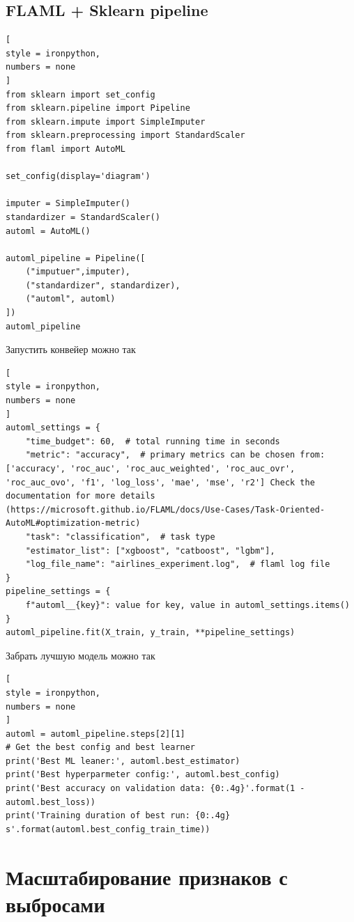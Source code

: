 \documentclass[%
	11pt,
	a4paper,
	utf8,
		]{article}
\begin{document}
\subsection{FLAML + Sklearn pipeline}

\begin{lstlisting}[
style = ironpython,
numbers = none
]
from sklearn import set_config
from sklearn.pipeline import Pipeline
from sklearn.impute import SimpleImputer
from sklearn.preprocessing import StandardScaler
from flaml import AutoML

set_config(display='diagram')

imputer = SimpleImputer()
standardizer = StandardScaler()
automl = AutoML()

automl_pipeline = Pipeline([
	("imputuer",imputer),
	("standardizer", standardizer),
	("automl", automl)
])
automl_pipeline
\end{lstlisting}

Запустить конвейер можно так
\begin{lstlisting}[
style = ironpython,
numbers = none
]
automl_settings = {
	"time_budget": 60,  # total running time in seconds
	"metric": "accuracy",  # primary metrics can be chosen from: ['accuracy', 'roc_auc', 'roc_auc_weighted', 'roc_auc_ovr', 'roc_auc_ovo', 'f1', 'log_loss', 'mae', 'mse', 'r2'] Check the documentation for more details (https://microsoft.github.io/FLAML/docs/Use-Cases/Task-Oriented-AutoML#optimization-metric)
	"task": "classification",  # task type
	"estimator_list": ["xgboost", "catboost", "lgbm"],
	"log_file_name": "airlines_experiment.log",  # flaml log file
}
pipeline_settings = {
	f"automl__{key}": value for key, value in automl_settings.items()
}
automl_pipeline.fit(X_train, y_train, **pipeline_settings)
\end{lstlisting}

Забрать лучшую модель можно так
\begin{lstlisting}[
style = ironpython,
numbers = none
]
automl = automl_pipeline.steps[2][1]
# Get the best config and best learner
print('Best ML leaner:', automl.best_estimator)
print('Best hyperparmeter config:', automl.best_config)
print('Best accuracy on validation data: {0:.4g}'.format(1 - automl.best_loss))
print('Training duration of best run: {0:.4g} s'.format(automl.best_config_train_time))
\end{lstlisting}


\section{Масштабирование признаков с выбросами}
\end{document}
